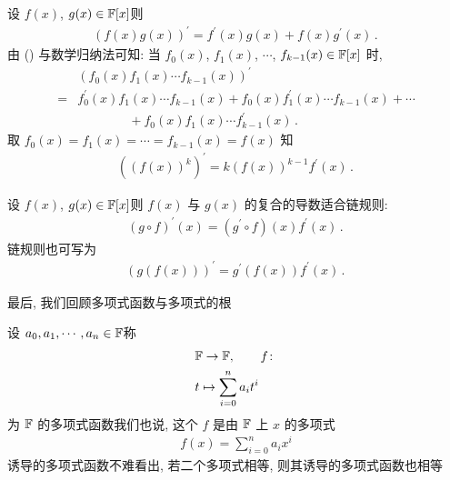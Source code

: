 \begin{proposition}
    设 $f(x)$, $g(x) \in \mathbb{F}[x]$\period 则
    \begin{align*}
        (f(x) g(x))^{\prime} = f^{\prime} (x) g(x) + f(x) g^{\prime} (x) \period \tag*{(\myStar)}
    \end{align*}
    由 (\myStar) 与数学归纳法可知: 当 $f_0 (x)$, $f_1 (x)$, $\cdots$, $f_{k-1} (x) \in \mathbb{F}[x]$ 时,
    \begin{align*}
             & (f_0 (x) f_1 (x) \cdots f_{k-1} (x))^{\prime}                                                      \\
        = {} & f_0^{\prime} (x) f_1 (x) \cdots f_{k-1} (x) + f_0 (x) f_1^{\prime} (x) \cdots f_{k-1} (x) + \cdots \\
             & \qquad \qquad + f_0 (x) f_1 (x) \cdots f_{k-1}^{\prime} (x) \period
    \end{align*}
    取 $f_0 (x) = f_1 (x) = \cdots = f_{k-1} (x) = f(x)$ 知
    \begin{align*}
        ((f(x))^k)^{\prime} = k(f(x))^{k-1} f^{\prime} (x) \period
    \end{align*}
\end{proposition}

\begin{proposition}
    设 $f(x)$, $g(x) \in \mathbb{F}[x]$\period 则 $f(x)$ 与 $g(x)$ 的复合的导数适合链规则:
    \begin{align*}
        (g \circ f)^{\prime} (x) = (g^{\prime} \circ f)(x) f^{\prime} (x) \period
    \end{align*}
    链规则也可写为
    \begin{align*}
        (g(f(x)))^{\prime} = g^{\prime} (f(x)) f^{\prime} (x) \period
    \end{align*}
\end{proposition}

最后, 我们回顾多项式函数与多项式的根\period

\begin{definition}
    设 $a_0, a_1, \cdots, a_n \in \mathbb{F}$\period 称
    \begin{align*}
         & \mathbb{F} \to \mathbb{F}, \tag*{$f \colon$}   \\
         & t \mapsto \sum_{i = 0}^n a_i t^i
    \end{align*}
    为 $\mathbb{F}$ 的多项式函数\period 我们也说, 这个 $f$ 是由 $\mathbb{F}$ 上 $x$ 的多项式
    \begin{align*}
        f(x) = \sum_{i = 0}^n a_i x^i
    \end{align*}
    诱导的多项式函数\period 不难看出, 若二个多项式相等, 则其诱导的多项式函数也相等\period
\end{definition}

